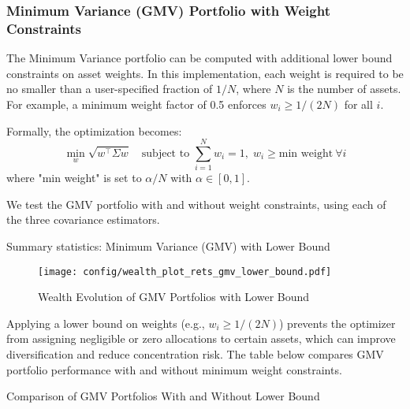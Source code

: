 \documentclass{article}
\begin{document}
\subsubsection{Minimum Variance (GMV) Portfolio with Weight Constraints}

The Minimum Variance portfolio can be computed with additional lower bound constraints on asset weights. In this implementation, each weight is required to be no smaller than a user-specified fraction of $1/N$, where $N$ is the number of assets. For example, a minimum weight factor of 0.5 enforces $w_i \geq 1/(2N)$ for all $i$.

Formally, the optimization becomes:
\[
\min_{w} \sqrt{w^\top \Sigma w}
\quad \text{subject to } \sum_{i=1}^N w_i = 1,\; w_i \geq \text{min weight} \ \forall i
\]
where "min weight" is set to $\alpha / N$ with $\alpha \in [0,1]$.

We test the GMV portfolio with and without weight constraints, using each of the three covariance estimators.


\begin{table}[htbp]
\centering
\caption{Summary statistics: Minimum Variance (GMV) with Lower Bound}
\label{tab:stats_gmv_lb}
\begin{adjustbox}{max width=\textwidth}
    
\end{adjustbox}
\end{table}



\begin{figure}[htbp]
    \centering
    \texttt{[image: config/wealth\_plot\_rets\_gmv\_lower\_bound.pdf]}
    \caption{Wealth Evolution of GMV Portfolios with Lower Bound}
    \label{fig:wealth_gmv_lb}
\end{figure}


\newpage

\noindent
Applying a lower bound on weights (e.g., $w_i \geq 1/(2N)$) prevents the optimizer from assigning negligible or zero allocations to certain assets, which can improve diversification and reduce concentration risk. The table below compares GMV portfolio performance with and without minimum weight constraints.


\begin{table}[htbp]
\centering
\caption{Comparison of GMV Portfolios With and Without Lower Bound}
\label{tab:stats_gmv_vs}
\begin{adjustbox}{max width=\textwidth}
    
\end{adjustbox}
\end{table}
\end{document}
